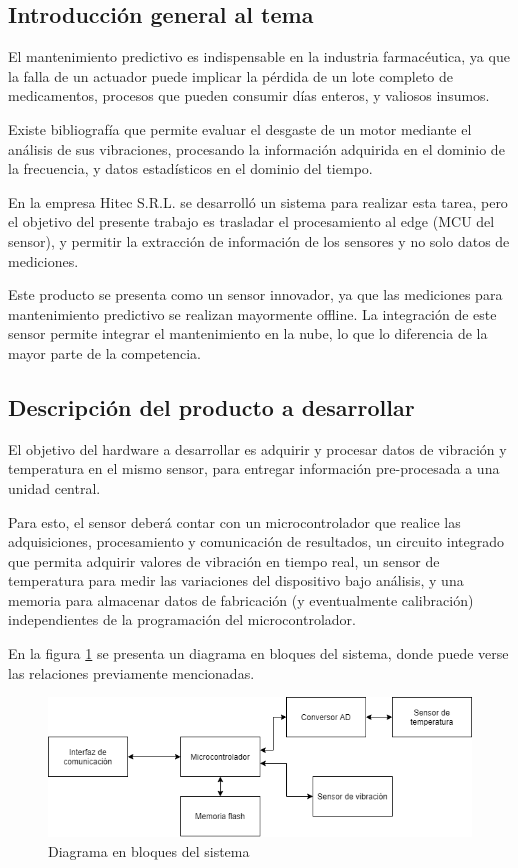 \documentclass[11pt]{charter}
\begin{document}
\subsection*{Introducción general al tema}

El mantenimiento predictivo es indispensable en la industria farmacéutica, ya que la falla de un actuador puede implicar la pérdida de un lote completo de medicamentos, procesos que pueden consumir días enteros, y valiosos insumos.

Existe bibliografía que permite evaluar el desgaste de un motor mediante el análisis de sus vibraciones, procesando la información adquirida en el dominio de la frecuencia, y datos estadísticos en el dominio del tiempo.

En la empresa Hitec S.R.L. se desarrolló un sistema para realizar esta tarea, pero el objetivo del presente trabajo es trasladar el procesamiento al edge (MCU del sensor), y permitir la extracción de información de los sensores y no solo datos de mediciones.

Este producto se presenta como un sensor innovador, ya que las mediciones para mantenimiento predictivo se realizan mayormente offline. La integración de este sensor permite integrar el mantenimiento en la nube, lo que lo diferencia de la mayor parte de la competencia.

\subsection*{Descripción del producto a desarrollar}

El objetivo del hardware a desarrollar es adquirir y procesar datos de vibración y temperatura en el mismo sensor, para entregar información pre-procesada a una unidad central.

Para esto, el sensor deberá contar con un microcontrolador que realice las adquisiciones, procesamiento y comunicación de resultados, un circuito integrado que permita adquirir valores de vibración en tiempo real, un sensor de temperatura para medir las variaciones del dispositivo bajo análisis, y una memoria para almacenar datos de fabricación (y eventualmente calibración) independientes de la programación del microcontrolador. 

En la figura \ref{fig:diagramaBloques} se presenta un diagrama en bloques del sistema, donde puede verse las relaciones previamente mencionadas.

\begin{figure}[htpb]
\centering 
\includegraphics[width=1\textwidth]{./Figuras/diagramaBloques.png}
\caption{Diagrama en bloques del sistema}
\label{fig:diagramaBloques}
\end{figure}
\end{document}
